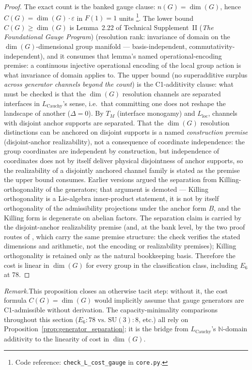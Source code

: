 \documentclass[11pt]{article}
\theoremstyle{definition}
\newcommand{\SU}{\mathrm{SU}}
\newcommand{\coderef}[2]{\footnote{Code reference: \texttt{#1} in \texttt{#2}.}}
\newcommand{\codeid}[1]{\texttt{\seqsplit{#1}}}%
\newcommand{\TSII}{Technical Supplement~II (\emph{The Foundational Gauge Program})}
\begin{document}
\begin{proof}
The exact count is the banked gauge clause: $n(G) = \dim(G)$, hence
$C(G) = \dim(G) \cdot \varepsilon$ in $F(1) = 1$ units
\coderef{check\_L\_cost\_gauge}{core.py}.  The lower bound
$C(G) \ge \dim(G)$ is Lemma~2.22 of \TSII{} (resolution rank:
invariance of domain on the $\dim(G)$-dimensional group manifold ---
basis-independent, commutativity-independent), and it consumes that
lemma's named operational-encoding premise: a continuous injective
operational encoding of the local group action is what invariance of
domain applies to.  The upper bound (no
superadditive surplus \emph{across generator channels beyond the
count}) is the C1-additivity clause: what must be checked is that the
$\dim(G)$ resolution channels are separated interfaces in
$L_{\mathrm{Cauchy}}$'s sense, i.e.\ that committing one does not
reshape the landscape of another ($\Delta = 0$).  By $T_M$ (interface
monogamy) and $L_{\mathrm{loc}}$, channels with disjoint anchor
supports are separated.  That the $\dim(G)$ resolution distinctions
can be anchored on disjoint supports is a named \emph{construction
premise} (disjoint-anchor realizability), not a consequence of
coordinate independence: the group coordinates are independent by
construction, but independence of coordinates does not by itself
deliver physical disjointness of anchor supports, so the realizability
of a disjointly anchored channel family is stated as the premise the
upper bound consumes.  Earlier versions argued the separation
from Killing-orthogonality of the generators; that argument is
demoted --- Killing orthogonality is a Lie-algebra inner-product
statement, it is not by itself orthogonality of the admissibility
projections under the anchor form $B$, and the Killing form is
degenerate on abelian factors.  The separation claim is carried by
the disjoint-anchor realizability premise (and, at the bank level, by
the two proof routes of \codeid{check\_L\_cost\_gauge}, which carry
the same premise structure: the check verifies the stated dimensions
and arithmetic, not the encoding or realizability premises); Killing
orthogonality is retained only as the natural bookkeeping basis.  Therefore the cost
is linear in $\dim(G)$ for every group in the classification class,
including $E_6$ at 78.
\end{proof}

\smallskip\noindent\textit{Remark.}\quad This proposition closes an otherwise
tacit step: without it, the cost formula $C(G) = \dim(G)$ would implicitly
assume that gauge generators are C1-admissible without derivation.
The capacity-minimality comparisons throughout this section
($E_6 \colon 78 \text{ vs.\ } \SU(3) \colon 8$, etc.) all rely on
Proposition~\ref{prop:generator_separation}; it is the bridge from
$L_{\mathrm{Cauchy}}$'s $\mathbb{N}$-domain additivity to the linearity
of cost in $\dim(G)$.
\end{document}

